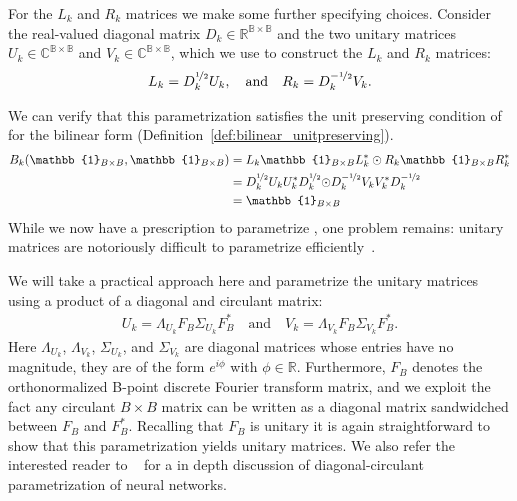 

For the $L_k$ and $R_k$ matrices we make some further specifying choices. Consider the real-valued diagonal matrix $D_k \in \mathbb{R^{B\times B}}$ and the two unitary matrices $U_k \in \mathbb{C^{B\times B}}$ and $V_k \in \mathbb{C^{B\times B}}$, which we use to construct the $L_k$ and $R_k$ matrices:
\begin{align}
	L_k  = D_k^{\nicefrac{1}{2}} U_k,
	\quad \text{and} \quad
	R_k  = D_k^{-\nicefrac{1}{2}} V_k.
\end{align}


We can verify that this parametrization satisfies the unit preserving condition of for the bilinear form (\cf Definition~\ref{def:bilinear_unitpreserving}).
\begin{align}
	B_k(\mathbb{1}_{B\times B}, \mathbb{1}_{B\times B})
	 & = L_k \mathbb{1}_{B\times B} L_k^* \odot R_k \mathbb{1}_{B\times B} R_k^*
	\nonumber
	\\
	 & =D_k^{\nicefrac{1}{2}} U_k  U_k^* D_k^{\nicefrac{1}{2}}
	{\odot}
	D_k^{-\nicefrac{1}{2}} V_k  V_k^* D_k^{-\nicefrac{1}{2}}
	\nonumber
	\\
	 & = \mathbb{1}_{B\times B}
\end{align}
While we now have a prescription to parametrize \puncs, one problem remains: unitary matrices are notoriously difficult to parametrize efficiently~\citep{kiani2022projunn,jing2017tunable,lezcano2019cheap,mhammedi2017efficient,wisdom2016full}.

We will take a practical approach here and parametrize the unitary matrices using a product of a diagonal and circulant matrix:
\begin{align}
	U_k = \Lambda_{U_k} F_B \Sigma_{U_k} F_B^{*}
	\quad \text{and} \quad
	V_k = \Lambda_{V_k} F_B \Sigma_{V_k} F_B^{*}.
\end{align}
Here $\Lambda_{U_k}$, $\Lambda_{V_k}$,  $\Sigma_{U_k}$, and $\Sigma_{V_k}$ are diagonal matrices whose entries have no magnitude, \ie they are of the form $e^{i\phi}$ with $\phi \in \mathbb{R}$. Furthermore, $F_B$ denotes the orthonormalized B-point discrete Fourier transform matrix, and we exploit the fact any circulant $B\times B$ matrix can be written as a diagonal matrix sandwidched between $F_B$ and $F_B^*$. Recalling that $F_B$ is unitary it is again straightforward to show that this parametrization yields unitary matrices. We also refer the interested reader to ~\citet{araujo2020understanding} for a in depth discussion of diagonal-circulant parametrization of neural networks.

